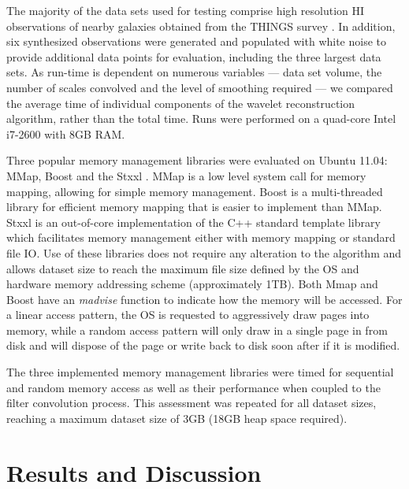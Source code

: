 The majority of the data sets used for testing comprise high resolution HI observations of nearby galaxies obtained from the THINGS survey \citep{Walter2008}. In addition, six synthesized observations were generated and populated with white noise to provide additional data points for evaluation, including the three largest data sets. As run-time is dependent on numerous variables ---  data set volume, the number of scales convolved  and the level of smoothing required --- we compared the average time of  individual components of the wavelet reconstruction algorithm, rather than the total time.  Runs were performed on a quad-core Intel i7-2600 with 8GB RAM.

Three popular memory management libraries were evaluated on Ubuntu 11.04: MMap, Boost \citep{Gaz2012} and the Stxxl \citep{Dementiev2005}. MMap is a low level system call for memory mapping, allowing for simple memory management. Boost is a multi-threaded library for efficient memory mapping that is easier to implement than MMap. Stxxl is an out-of-core implementation of the C++ standard template library which facilitates memory management either with memory mapping or standard file IO. Use of these libraries does not require any alteration to the algorithm  and allows dataset size to reach the maximum file size defined by the OS and hardware memory addressing scheme (approximately 1TB). Both Mmap and Boost have an \emph{madvise}  function to indicate how the memory will be accessed. For a linear access pattern, the OS is requested to aggressively draw pages into memory, while  a random access pattern will only draw in a single page in from disk and will dispose of the page or write back to disk soon after if it is modified.

The three implemented memory management libraries were timed for sequential and random memory access as well as their performance when coupled to the filter convolution process.  This assessment  was repeated for all dataset sizes, reaching a maximum dataset size of 3GB (18GB heap space required). 


\section{Results and Discussion}
  

